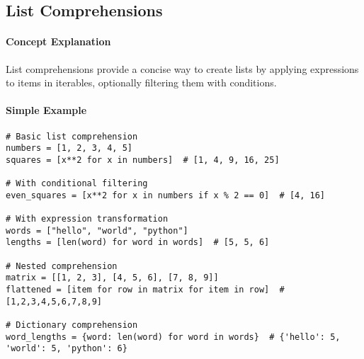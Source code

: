 \subsection{List Comprehensions}

\paragraph{Concept Explanation}
List comprehensions provide a concise way to create lists by applying expressions to items in iterables, optionally filtering them with conditions.

\paragraph{Simple Example}
\begin{lstlisting}[caption=List Comprehension Examples]
# Basic list comprehension
numbers = [1, 2, 3, 4, 5]
squares = [x**2 for x in numbers]  # [1, 4, 9, 16, 25]

# With conditional filtering
even_squares = [x**2 for x in numbers if x % 2 == 0]  # [4, 16]

# With expression transformation
words = ["hello", "world", "python"]
lengths = [len(word) for word in words]  # [5, 5, 6]

# Nested comprehension
matrix = [[1, 2, 3], [4, 5, 6], [7, 8, 9]]
flattened = [item for row in matrix for item in row]  # [1,2,3,4,5,6,7,8,9]

# Dictionary comprehension
word_lengths = {word: len(word) for word in words}  # {'hello': 5, 'world': 5, 'python': 6}
\end{lstlisting}

